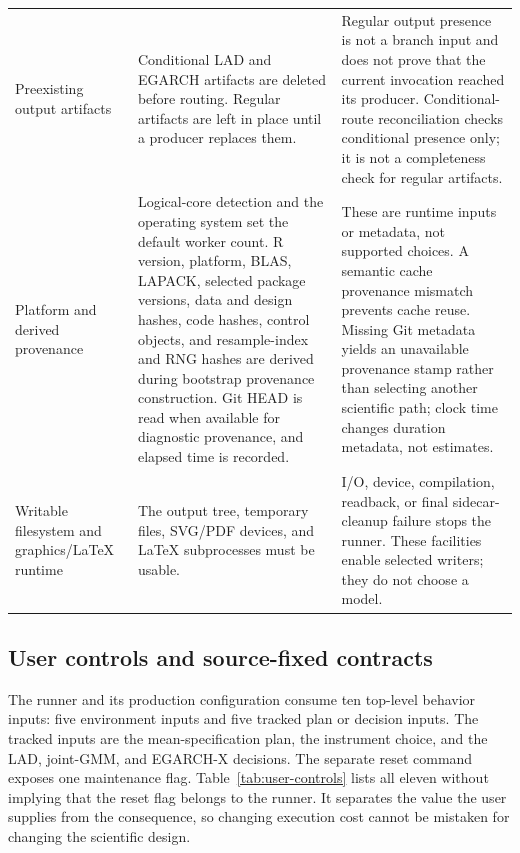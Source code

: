 \documentclass[11pt]{article}
\begin{document}
\begin{longtable}{@{}>{\raggedright\arraybackslash}p{}
  >{\raggedright\arraybackslash}p{}
  >{\raggedright\arraybackslash}p{}@{}}
Preexisting output artifacts &
Conditional LAD and EGARCH artifacts are deleted before routing. Regular
artifacts are left in place until a producer replaces them. &
Regular output presence is not a branch input and does not prove that the
current invocation reached its producer. Conditional-route reconciliation
checks conditional presence only; it is not a completeness check for regular
artifacts.\\
Platform and derived provenance &
Logical-core detection and the operating system set the default worker count.
R version, platform, BLAS, LAPACK, selected package versions, data and design
hashes, code hashes, control objects, and resample-index and RNG hashes are
derived during bootstrap provenance construction. Git HEAD is read when
available for diagnostic provenance, and elapsed time is recorded. &
These are runtime inputs or metadata, not supported choices. A semantic cache
provenance mismatch prevents cache reuse. Missing Git metadata yields an
unavailable provenance stamp rather than selecting another scientific path;
clock time changes duration metadata, not estimates.\\
Writable filesystem and graphics/LaTeX runtime &
The output tree, temporary files, SVG/PDF devices, and LaTeX subprocesses must be
usable. &
I/O, device, compilation, readback, or final sidecar-cleanup failure stops the
runner. These facilities enable selected writers; they do not choose a model.\\
\bottomrule
\end{longtable}
\endgroup

\subsection{User controls and source-fixed contracts}
\label{sec:user-controls}

The runner and its production configuration consume ten top-level behavior
inputs: five environment inputs and five tracked plan or decision inputs. The
tracked inputs are the mean-specification plan, the instrument choice, and the
LAD, joint-GMM, and EGARCH-X decisions. The separate reset command exposes one
maintenance flag.
Table~\ref{tab:user-controls} lists all eleven without implying that the reset
flag belongs to the runner. It separates the value
the user supplies from the consequence, so changing execution cost cannot be
mistaken for changing the scientific design.
\end{document}
